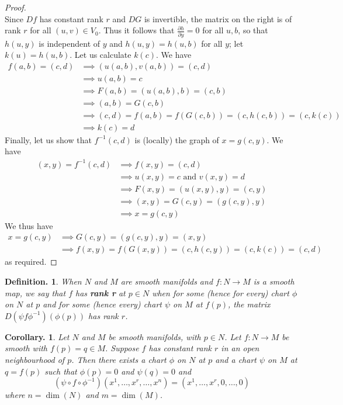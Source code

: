\documentclass[11pt, a4paper]{memoir}
\theoremstyle{change}
\newtheorem{corollary}[theorem]{Corollary.}
\theoremstyle{plain}
\theoremstyle{nonumberplain}
\newtheorem{definition}{Definition.}
\newtheorem{proof}{Proof}
\newcommand{\prt}[2]{\ensuremath{\frac{\partial #1}{\partial #2}}}
\numberwithin{equation}{section}
\begin{document}
\begin{proof}
\begin{equation*}
    \end{equation*}
    Since $Df$ has constant rank $r$ and $DG$ is invertible, the matrix on the right is of rank $r$ for all $(u,v)\in V_0$.
    Thus it follows that $\prt{h}{y}=0$ for all $u,b$, so that $h(u,y)$ is independent of $y$ and $h(u,y)=h(u,b)$ for all $y$; let $k(u)=h(u,b)$.
    Let us calculate $k(c)$.
    We have
    \begin{align*}
        f(a,b) = (c,d) &\implies (u(a,b),v(a,b))=(c,d)\\
                       &\implies u(a,b)=c\\
                       &\implies F(a,b)=(u(a,b),b)=(c,b)\\
                       &\implies (a,b)=G(c,b)\\
                       &\implies (c,d)=f(a,b)=f(G(c,b))=(c,h(c,b))=(c,k(c))\\
                       &\implies k(c)=d
    \end{align*}
    Finally, let us show that $f^{-1}(c,d)$ is (locally) the graph of $x=g(c,y)$.
    We have
    \begin{align*}
        (x,y)=f^{-1}(c,d) &\implies f(x,y)=(c,d)\\
                          &\implies u(x,y)=c\text{ and }v(x,y)=d\\
                          &\implies F(x,y)=(u(x,y),y)=(c,y)\\
                          &\implies (x,y)=G(c,y)=(g(c,y),y)\\
                          &\implies x=g(c,y)
    \end{align*}
    We thus have
    \begin{align*}
        x=g(c,y) &\implies G(c,y)=(g(c,y),y)=(x,y)\\
                 &\implies f(x,y)=f(G(x,y))=(c,h(c,y))=(c,k(c))=(c,d)
    \end{align*}
    as required.
\end{proof}
\begin{definition}
    When $N$ and $M$ are smooth manifolds and $f:N\to M$ is a smooth map, we say that $f$ has \textbf{rank r} at $p\in N$ when for some (hence for every) chart $\phi$ on $N$ at $p$ and for some (hence every) chart $\psi$ on $M$ at $f(p)$, the matrix $D(\psi f \phi^{-1})(\phi(p))$ has rank $r$.
\end{definition}
\begin{corollary}
    Let $N$ and $M$ be smooth manifolds, with $p\in N$.
    Let $f:N\to M$ be smooth with $f(p)=q\in M$.
    Suppose $f$ has constant rank $r$ in an open neighbourhood of $p$.
    Then there exists a chart $\phi$ on $N$ at $p$ and a chart $\psi$ on $M$ at $q=f(p)$ such that $\phi(p)=0$ and $\psi(q)=0$ and
    \begin{equation*}
        (\psi\circ f\circ\phi^{-1})(x^1,\ldots,x^r,\ldots,x^n)=(x^1,\ldots,x^r,0,\ldots,0)
    \end{equation*}
    where $n=\dim(N)$ and $m=\dim(M)$.
\end{corollary}
\end{document}
